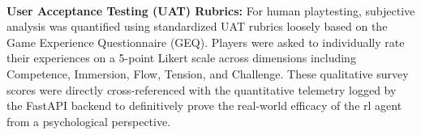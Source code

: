 \paragraph{} \textbf{User Acceptance Testing (UAT) Rubrics:} For human playtesting, subjective analysis was quantified using standardized UAT rubrics loosely based on the Game Experience Questionnaire (GEQ). Players were asked to individually rate their experiences on a 5-point Likert scale across dimensions including Competence, Immersion, Flow, Tension, and Challenge. These qualitative survey scores were directly cross-referenced with the quantitative telemetry logged by the FastAPI backend to definitively prove the real-world efficacy of the \ac{rl} agent from a psychological perspective.
